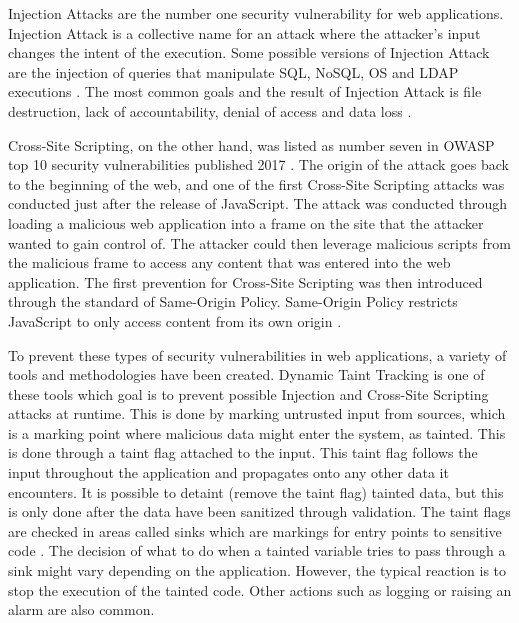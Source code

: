 \documentclass{../kththesis}
\begin{document}
	Injection Attacks are the number one security vulnerability for web applications. Injection Attack is a collective name for an attack where the attacker's input changes the intent of the execution. Some possible versions of Injection Attack are the injection of queries that manipulate SQL, NoSQL, OS and LDAP executions \parencite{OWASP2017}. The most common goals and the result of Injection Attack is file destruction, lack of accountability, denial of access and data loss \parencite{Secure_Web}.
	
	Cross-Site Scripting, on the other hand, was listed as number seven in OWASP top 10 security vulnerabilities published 2017 \parencite{OWASP2017}. The origin of the attack goes back to the beginning of the web, and one of the first Cross-Site Scripting attacks was conducted just after the release of JavaScript. The attack was conducted through loading a malicious web application into a frame on the site that the attacker wanted to gain control of. The attacker could then leverage malicious scripts from the malicious frame to access any content that was entered into the web application. The first prevention for Cross-Site Scripting was then introduced through the standard of Same-Origin Policy. Same-Origin Policy restricts JavaScript to only access content from its own origin \parencite{FogieSeth2007Xacs, w3csop}.
	
To prevent these types of security vulnerabilities in web applications, a variety of tools and methodologies have been created. Dynamic Taint Tracking is one of these tools which goal is to prevent possible Injection and Cross-Site Scripting attacks at runtime. This is done by marking untrusted input from sources, which is a marking point where malicious data might enter the system, as tainted. This is done through a taint flag attached to the input. This taint flag follows the input throughout the application and propagates onto any other data it encounters. It is possible to detaint (remove the taint flag) tainted data, but this is only done after the data have been sanitized through validation. The taint flags are checked in areas called sinks which are markings for entry points to sensitive code \parencite{Pan2015, Venkataramani2008}. The decision of what to do when a tainted variable tries to pass through a sink might vary depending on the application. However, the typical reaction is to stop the execution of the tainted code. Other actions such as logging or raising an alarm are also common. 
	
\end{document}
